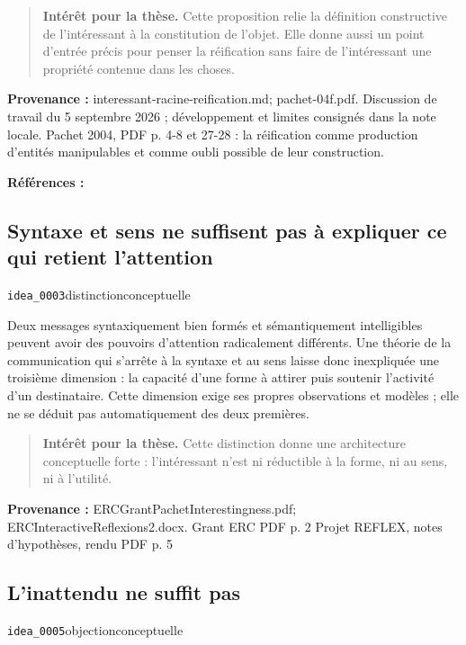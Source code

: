 \documentclass[10pt,a4paper]{article}
\begin{document}
\begin{quote}
\textbf{Intérêt pour la thèse.} Cette proposition relie la définition constructive de l'intéressant à la constitution de l'objet. Elle donne aussi un point d'entrée précis pour penser la réification sans faire de l'intéressant une propriété contenue dans les choses.
\end{quote}
{\footnotesize\color{metadata}\textbf{Provenance :} interessant-racine-reification.md; pachet-04f.pdf. Discussion de travail du 5 septembre 2026 ; développement et limites consignés dans la note locale. Pachet 2004, PDF p. 4-8 et 27-28 : la réification comme production d'entités manipulables et comme oubli possible de leur construction.\par}
{\footnotesize\color{metadata}\textbf{Références :} \parencite{pachet2004reification}\par}

\subsection{Syntaxe et sens ne suffisent pas à expliquer ce qui retient l'attention}
{\small\color{metadata} \texttt{idea\_0003}\quad\textbullet\quad distinction\quad\textbullet\quad conceptuelle\par}

Deux messages syntaxiquement bien formés et sémantiquement intelligibles peuvent avoir des pouvoirs d'attention radicalement différents. Une théorie de la communication qui s'arrête à la syntaxe et au sens laisse donc inexpliquée une troisième dimension : la capacité d'une forme à attirer puis soutenir l'activité d'un destinataire. Cette dimension exige ses propres observations et modèles ; elle ne se déduit pas automatiquement des deux premières.

\begin{quote}
\textbf{Intérêt pour la thèse.} Cette distinction donne une architecture conceptuelle forte : l'intéressant n'est ni réductible à la forme, ni au sens, ni à l'utilité.
\end{quote}
{\footnotesize\color{metadata}\textbf{Provenance :} ERCGrantPachetInterestingness.pdf; ERCInteractiveReflexions2.docx. Grant ERC PDF p. 2 Projet REFLEX, notes d'hypothèses, rendu PDF p. 5\par}

\subsection{L'inattendu ne suffit pas}
{\small\color{metadata} \texttt{idea\_0005}\quad\textbullet\quad objection\quad\textbullet\quad conceptuelle\par}
\end{document}
